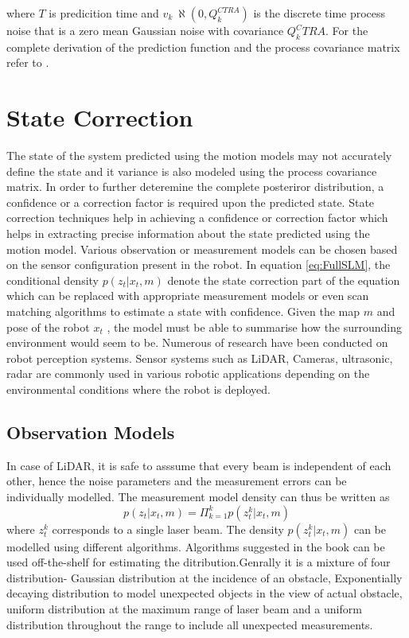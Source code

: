 where $T$ is predicition time and $v_k ~ \aleph(0,Q_k^{CTRA})$ is the discrete time process noise that is a zero mean Gaussian noise with covariance $Q_k^CTRA$. For the complete derivation of the prediction function and the 
process covariance matrix refer to \cite{D.Svensson}.

\section{State Correction}
    The state of the system predicted using the motion models may not accurately define the state and it variance is also modeled using the process covariance matrix. In order to further deteremine 
the complete posteriror distribution, a confidence or a correction factor is required upon the predicted state. State correction techniques help in achieving a confidence or correction factor which
helps in extracting precise information about the state predicted using the motion model. Various observation or measurement models can be chosen based on the sensor configuration present in the robot.
In equation \ref{eq:FullSLM}, the conditional density $p(z_t | x_t, m)$ denote the state correction part of the equation which can be replaced with appropriate measurement models or even scan matching algorithms 
to estimate a state with confidence. Given the map $m$ and pose of the robot $x_t$ , the model must be able to summarise how the surrounding environment would seem to be. Numerous of research have been conducted
on robot perception systems. Sensor systems such as LiDAR, Cameras, ultrasonic, radar are commonly used in various robotic applications depending on the environmental conditions where the robot is deployed.

\subsection{Observation Models}
In case of LiDAR, it is safe to asssume that every beam is independent of each other, hence the noise parameters and the measurement errors can be individually modelled. The measurement model density can
thus be written as 
\begin{equation}
    p(z_t | x_t, m)  = \Pi_{k=1}^k  p(z_t^k | x_t, m)
\end{equation}
where  $z_t^k$ corresponds to a single laser beam. The density $p(z_t^k | x_t, m)$ can be modelled using different algorithms. Algorithms suggested in the book \cite{Thrun98aprobabilistic} can be used 
off-the-shelf for estimating the ditribution.Genrally it is a mixture of four distribution- Gaussian distribution at the incidence of an obstacle, Exponentially decaying distribution
to model unexpected objects in the view of actual obstacle, uniform distribution at the maximum range of laser beam and a uniform distribution throughout the range to include all unexpected measurements.

